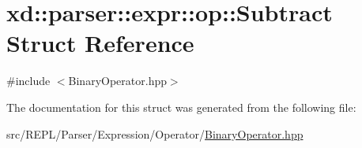 \hypertarget{structxd_1_1parser_1_1expr_1_1op_1_1_subtract}{}\section{xd\+:\+:parser\+:\+:expr\+:\+:op\+:\+:Subtract Struct Reference}
\label{structxd_1_1parser_1_1expr_1_1op_1_1_subtract}


{\ttfamily \#include $<$Binary\+Operator.\+hpp$>$}



The documentation for this struct was generated from the following file\+:\begin{DoxyCompactItemize}
\item 
src/\+R\+E\+P\+L/\+Parser/\+Expression/\+Operator/\mbox{\hyperlink{_binary_operator_8hpp}{Binary\+Operator.\+hpp}}\end{DoxyCompactItemize}
